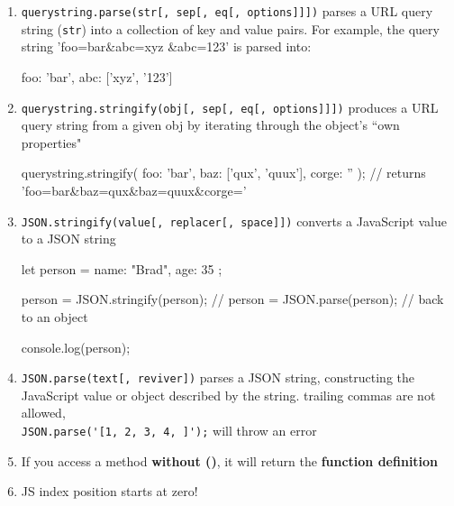 \documentclass[a4paper,12pt]{article}
\begin{document}
\begin{enumerate}
\item \verb|querystring.parse(str[, sep[, eq[, options]]])| parses a URL query string (\verb|str|) into a collection of key and value pairs. For example, the query string 'foo=bar\&abc=xyz \&abc=123' is parsed into:
\begin{jscode}
{
	foo: 'bar',
	abc: ['xyz', '123']
}	
\end{jscode}

\item \verb|querystring.stringify(obj[, sep[, eq[, options]]])| produces a URL query string from a given obj by iterating through the object's ``own properties"
\begin{jscode}
querystring.stringify({ foo: 'bar', baz: ['qux', 'quux'], corge: '' });
// returns 'foo=bar&baz=qux&baz=quux&corge='	
\end{jscode}

\item \verb|JSON.stringify(value[, replacer[, space]])| converts a JavaScript value to a JSON string
\begin{jscode}
let person = {
  name: "Brad",
  age: 35
};

person = JSON.stringify(person);
// person = JSON.parse(person);  // back to an object

console.log(person);
\end{jscode}

\item \verb|JSON.parse(text[, reviver])| parses a JSON string, constructing the JavaScript value or object described by the string. trailing commas are not allowed,\\ \verb|JSON.parse('[1, 2, 3, 4, ]');| will throw an error

\item If you access a method \textbf{without ()}, it will return the \textbf{function definition}

\item JS index position starts at zero!
\end{enumerate}
\end{document}
